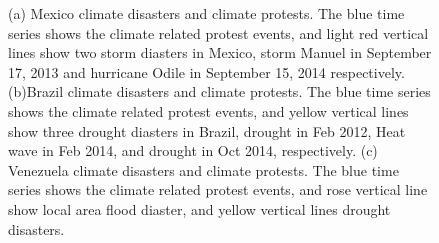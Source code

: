 \begin{figure}[t]
	\centering
	\caption{(a) Mexico climate disasters and climate protests. The blue time series shows the climate related protest events, and light red vertical lines show two storm diasters in Mexico, storm Manuel in September 17, 2013 and hurricane Odile in September 15, 2014 respectively. (b)Brazil climate disasters and climate protests. The blue time series shows the climate related protest events, and yellow vertical lines show three drought diasters in Brazil, drought in Feb 2012, Heat wave in Feb 2014, and drought in Oct 2014, respectively. (c) Venezuela climate disasters and climate protests. The blue time series shows the climate related protest events, and rose vertical line show local area flood diaster, and yellow vertical lines drought disasters.}
\label{climate-timeseries}
\end{figure}



